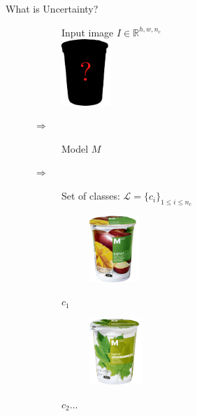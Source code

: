 \documentclass{beamer}
\begin{document}
\begin{frame}{What is Uncertainty?}
	\begin{figure}[H]
		\centering
		\begin{subfigure}{0.17\textwidth}
			\centering
			Input image $I \in \mathbb{R}^{h, w, n_c}$\\[.5cm]
			\includegraphics[height=2.5cm]{m-classic-joghurt-new}
		\end{subfigure}$\Rightarrow$
		\begin{subfigure}{0.14\textwidth}
			\centering
			Model $M$
		\end{subfigure} $ \Rightarrow$
		\pause
		\begin{subfigure}{0.58\textwidth}
			\centering
			Set of classes: $\mathcal{L}=\{c_i\}_{1\leq i\leq n_c}$\\ [.5cm]
				\begin{subfigure}{0.25\textwidth}
							\includegraphics[height=2.5cm]{m-classic-joghurt-apfelmango} 
				\end{subfigure}$c_1$
				\begin{subfigure}{0.25\textwidth}
						\includegraphics[height=2.5cm]{m-classic-joghurt-ahornsirup-stichfest} 
			\end{subfigure}	$c_2 \hdots$
		\end{subfigure}
	\end{figure}
\end{frame}
\end{document}
